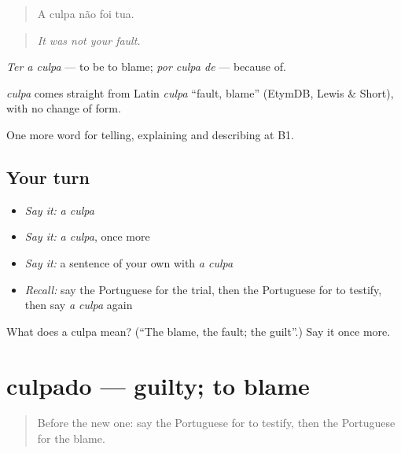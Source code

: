 \begin{quote}
A culpa não foi tua.
\end{quote}

\begin{quote}
\emph{It was not your fault.}
\end{quote}

\emph{Ter a culpa} — to be to blame; \emph{por culpa de} — because of.

\begin{cousinweb}
\emph{culpa} comes straight from Latin \emph{culpa} \textquotedblleft{}fault, blame\textquotedblright{} (EtymDB, Lewis \& Short), with no change of form.
\end{cousinweb}

\begin{grammarlens}[title={What you've built}]
One more word for telling, explaining and describing at B1.
\end{grammarlens}

\subsection*{Your turn}
\begin{itemize}
\raggedright
  \item \emph{Say it:} \emph{a culpa}
  \item \emph{Say it:} \emph{a culpa}, once more
  \item \emph{Say it:} a sentence of your own with \emph{a culpa}
  \item \emph{Recall:} say the Portuguese for the trial, then the Portuguese for to testify, then say \emph{a culpa} again
\end{itemize}

\begin{tcolorbox}[breakable,colback=teal!4,colframe=teal!35!black,title={Before you move on}]
What does a culpa mean? (\textquotedblleft{}The blame, the fault; the guilt\textquotedblright{}.) Say it once more.
\end{tcolorbox}
\section[culpado]{culpado — guilty; to blame}

\label{lesson:PT-C390-culpado}



\begin{quote}
Before the new one: say the Portuguese for to testify, then the Portuguese for the blame.
\end{quote}

